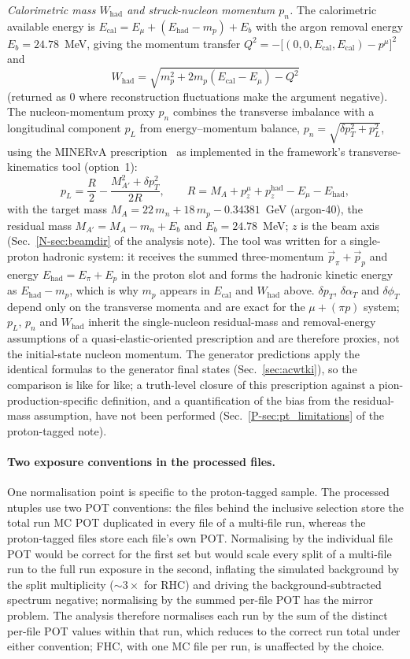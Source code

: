 \documentclass[11pt,a4paper]{article}
\newcommand{\ptref}[2]{#1~\ref{P-#2} of the proton-tagged note}
\newcommand{\noteref}[2]{#1~\ref{N-#2} of the analysis note}
\begin{document}
\emph{Calorimetric mass $W_\mathrm{had}$ and struck-nucleon momentum $p_n$.} The
calorimetric available energy is $E_\mathrm{cal}=E_\mu+(E_\mathrm{had}-m_p)+E_b$ with the
argon removal energy $E_b=24.78$~MeV, giving the momentum transfer
$Q^2=-\big[(0,0,E_\mathrm{cal},E_\mathrm{cal})-p^\mu\big]^2$ and
\[
  W_\mathrm{had}=\sqrt{m_p^2+2m_p(E_\mathrm{cal}-E_\mu)-Q^2}
\]
(returned as $0$ where reconstruction fluctuations make the argument negative). The
nucleon-momentum proxy $p_n$ combines the transverse imbalance with a longitudinal
component $p_L$ from energy--momentum balance, $p_n=\sqrt{\delta p_T^2+p_L^2}$, using the
MINERvA prescription~\cite{minerva_tki} as implemented in the framework's transverse-kinematics tool (option~1):
\[
  p_L=\frac{R}{2}-\frac{M_{A'}^2+\delta p_T^2}{2R},\qquad
  R=M_A+p^{\mu}_{z}+p^{\mathrm{had}}_{z}-E_\mu-E_\mathrm{had},
\]
with the target mass $M_A=22\,m_n+18\,m_p-0.34381$~GeV (argon-40), the residual mass
$M_{A'}=M_A-m_n+E_b$ and $E_b=24.78$~MeV; $z$ is the beam axis (\noteref{Sec.}{sec:beamdir}).
The tool was written for a single-proton hadronic system: it receives the summed
three-momentum $\vec p_\pi+\vec p_p$ and energy $E_\mathrm{had}=E_\pi+E_p$ in the proton
slot and forms the hadronic kinetic energy as $E_\mathrm{had}-m_p$, which is why $m_p$
appears in $E_\mathrm{cal}$ and $W_\mathrm{had}$ above. $\delta p_T$, $\delta\alpha_T$ and
$\delta\phi_T$ depend only on the transverse momenta and are exact for the
$\mu+(\pi p)$ system; $p_L$, $p_n$ and $W_\mathrm{had}$ inherit the single-nucleon
residual-mass and removal-energy assumptions of a quasi-elastic-oriented prescription and
are therefore proxies, not the initial-state nucleon momentum. The generator
predictions apply the identical formulas to the generator final states
(Sec.~\ref{sec:acwtki}), so the comparison is like for like; a truth-level closure of
this prescription against a pion-production-specific definition, and a quantification of
the bias from the residual-mass assumption, have not been performed
(\ptref{Sec.}{sec:pt_limitations}).



\paragraph{Two exposure conventions in the processed files.}
One normalisation point is specific to the proton-tagged sample. The processed
ntuples use two POT conventions: the files behind the inclusive selection store the
total run MC POT duplicated in every file of a multi-file run, whereas the
proton-tagged files store each file's own POT. Normalising by the individual file
POT would be correct for the first set but would scale every split of a multi-file run to
the full run exposure in the second, inflating the simulated background by the split
multiplicity ($\sim\!3\times$ for RHC) and driving the background-subtracted spectrum
negative; normalising by the summed per-file POT has the mirror problem. The analysis
therefore normalises each run by the sum of the distinct per-file POT values
within that run, which reduces to the correct run total under either convention; FHC,
with one MC file per run, is unaffected by the choice.
\end{document}
